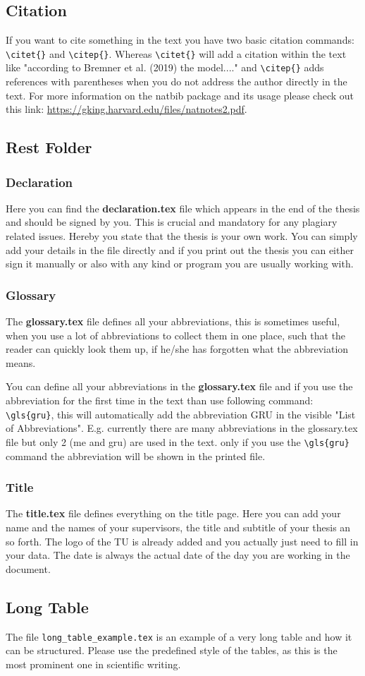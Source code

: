 \subsection{Citation}
If you want to cite something in the text you have two basic citation commands: \verb!\citet{}! and \verb!\citep{}!. Whereas \verb!\citet{}! will add a citation within the text like "according to Bremner et al. (2019) the model...." and \verb!\citep{}! adds references with parentheses when you do not address the author directly in the text. For more information on the natbib package and its usage please check out this link: \url{https://gking.harvard.edu/files/natnotes2.pdf}.

\subsection{Rest Folder}

\subsubsection{Declaration}
Here you can find the \textbf{declaration.tex} file which appears in the end of the thesis and should be signed by you. This is crucial and mandatory for any plagiary related issues. Hereby you state that the thesis is your own work. You can simply add your details in the file directly and if you print out the thesis you can either sign it manually or also with any kind or program you are usually working with.

\subsubsection{Glossary}
The \textbf{glossary.tex} file defines all your abbreviations, this is sometimes useful, when you use a lot of abbreviations to collect them in one place, such that the reader can quickly look them up, if he/she has forgotten what the abbreviation means.

You can define all your abbreviations in the \textbf{glossary.tex} file and if you use the abbreviation for the first time in the text than use following command: \verb!\gls{gru}!, this will automatically add the abbreviation GRU in the visible "List of Abbreviations". 
E.g. currently there are many abbreviations in the glossary.tex file but only 2 (\gls{me} and \gls{gru}) are used in the text. only if you use the  \verb!\gls{gru}! command the abbreviation will be shown in the printed file. 

\subsubsection{Title}
The \textbf{title.tex} file defines everything on the title page. Here you can add your name and the names of your supervisors, the title and subtitle of your thesis an so forth. The logo of the TU is already added and you actually just need to fill in your data. The date is always the actual date of the day you are working in the document. 

\subsection{Long Table}
The file \verb!long_table_example.tex! is an example of a very long table and how it can be structured. Please use the predefined style of the tables, as this is the most prominent one in scientific writing. 



